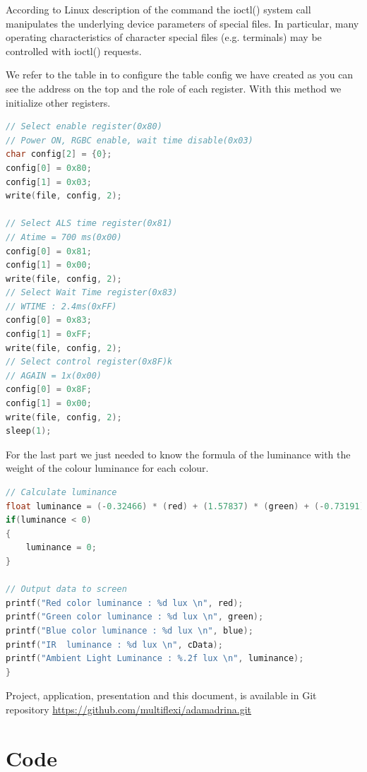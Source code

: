 \documentclass[UKenglish,10pt,a4paper]{report}
\begin{document}
According to Linux description of the command the ioctl() system call manipulates the underlying device parameters of special files. In particular, many operating characteristics of character special files (e.g. terminals) may be controlled with  ioctl() requests.

We refer to the table in \cite{rgb} to configure the table config we have created as you can see the address on the top and the role of each register. With this method we initialize other registers.

\begin{lstlisting}[language=C,frame=single]
// Select enable register(0x80)
// Power ON, RGBC enable, wait time disable(0x03)
char config[2] = {0};
config[0] = 0x80;
config[1] = 0x03;
write(file, config, 2);

// Select ALS time register(0x81)
// Atime = 700 ms(0x00)
config[0] = 0x81;
config[1] = 0x00;
write(file, config, 2);
// Select Wait Time register(0x83)
// WTIME : 2.4ms(0xFF)
config[0] = 0x83;
config[1] = 0xFF;
write(file, config, 2);
// Select control register(0x8F)k
// AGAIN = 1x(0x00)
config[0] = 0x8F;
config[1] = 0x00;
write(file, config, 2);
sleep(1);
\end{lstlisting} 

For the last part we just needed to know the formula of the luminance with the weight of the colour luminance for each colour.

\begin{lstlisting}[language=C,frame=single]
// Calculate luminance
float luminance = (-0.32466) * (red) + (1.57837) * (green) + (-0.73191) * (blue);
if(luminance < 0)
{
	luminance = 0;
}

// Output data to screen
printf("Red color luminance : %d lux \n", red);
printf("Green color luminance : %d lux \n", green);
printf("Blue color luminance : %d lux \n", blue);
printf("IR  luminance : %d lux \n", cData);
printf("Ambient Light Luminance : %.2f lux \n", luminance);
}
\end{lstlisting} 

Project, application, presentation and this document, is available in Git repository \url{https://github.com/multiflexi/adamadrina.git}

\chapter{Code}
\end{document}
